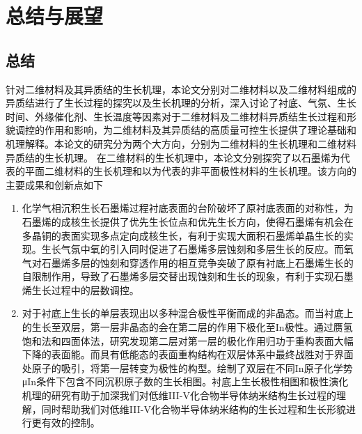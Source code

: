 
\chapter{总结与展望}
\section{总结}
针对二维材料及其异质结的生长机理，本论文分别对二维材料以及二维材料组成的异质结进行了生长过程的探究以及生长机理的分析，深入讨论了衬底、气氛、生长时间、外缘催化剂、生长温度等因素对于二维材料及二维材料异质结生长过程和形貌调控的作用和影响，为二维材料及其异质结的高质量可控生长提供了理论基础和机理解释。本论文的研究分为两个大方向，分别为二维材料的生长机理和二维材料异质结的生长机理。
在二维材料的生长机理中，本论文分别探究了以石墨烯为代表的平面二维材料的生长机理和以为代表的非平面极性材料的生长机理。该方向的主要成果和创新点如下\chinesecolon
\begin{enumerate}[label=（\arabic*）,wide]
    \item 化学气相沉积生长石墨烯过程衬底表面的台阶破坏了原衬底表面的对称性，为石墨烯的成核生长提供了优先生长位点和优先生长方向，使得石墨烯有机会在多晶铜的表面实现多点定向成核生长，有利于实现大面积石墨烯单晶生长的实现。生长气氛中氧的引入同时促进了石墨烯多层蚀刻和多层生长的反应。而氧气对石墨烯多层的蚀刻和穿透作用的相互竞争突破了原有衬底上石墨烯生长的自限制作用，导致了石墨烯多层交替出现蚀刻和生长的现象，有利于实现石墨烯生长过程中的层数调控。
    \item 对于衬底上生长的单层表现出以多种混合极性平衡而成的非晶态。而当衬底上的生长至双层，第一层非晶态的会在第二层的作用下极化至In极性。通过赝氢饱和法和四面体法，研究发现第二层对第一层的极化作用归功于重构表面大幅下降的表面能。而具有低能态的表面重构结构在双层体系中最终战胜对于界面处原子的吸引，将第一层转变为极性的构型。绘制了双层在不同In原子化学势μIn条件下包含不同沉积原子数的生长相图。衬底上生长极性相图和极性演化机理的研究有助于加深我们对低维III-V化合物半导体纳米结构生长过程的理解，同时帮助我们对低维III-V化合物半导体纳米结构的生长过程和生长形貌进行更有效的控制。
\end{enumerate}

